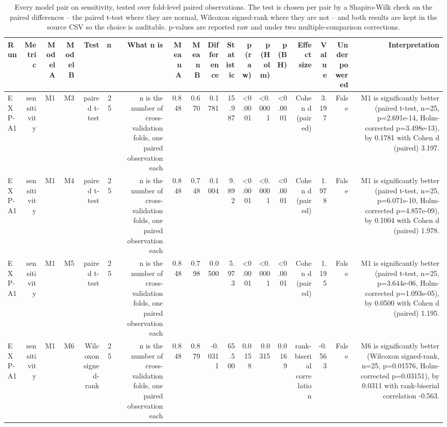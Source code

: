 \begin{table}[htbp]
  \centering
  \caption{Every model pair on sensitivity, tested over fold-level paired observations. The test is chosen per pair by a Shapiro-Wilk check on the paired differences -- the paired t-test where they are normal, Wilcoxon signed-rank where they are not -- and both results are kept in the source CSV so the choice is auditable. p-values are reported raw and under two multiple-comparison corrections.}
  \label{tab:t28}
  \begin{tabular}{lrrrrrrrrrrrrrrrrr}
    \toprule
    Run & Metric & Model A & Model B & Test & n & What n is & Mean A & Mean B & Difference & Statistic & p (raw) & p (Holm) & p (BH) & Effect size & Value & Underpowered & Interpretation \\
    \midrule
    EXP-A1 & sensitivity & M1 & M3 & paired t-test & 25 & n is the number of cross-validation folds, one paired observation each & 0.848 & 0.670 & 0.1781 & 15.987 & <0.0001 & <0.0001 & <0.0001 & Cohen d (paired) & 3.197 & False & M1 is significantly better (paired t-test, n=25, p=2.691e-14, Holm-corrected p=3.498e-13), by 0.1781 with Cohen d (paired) 3.197. \\
    EXP-A1 & sensitivity & M1 & M4 & paired t-test & 25 & n is the number of cross-validation folds, one paired observation each & 0.848 & 0.748 & 0.1004 & 9.892 & <0.0001 & <0.0001 & <0.0001 & Cohen d (paired) & 1.978 & False & M1 is significantly better (paired t-test, n=25, p=6.071e-10, Holm-corrected p=4.857e-09), by 0.1004 with Cohen d (paired) 1.978. \\
    EXP-A1 & sensitivity & M1 & M5 & paired t-test & 25 & n is the number of cross-validation folds, one paired observation each & 0.848 & 0.798 & 0.0500 & 5.973 & <0.0001 & <0.0001 & <0.0001 & Cohen d (paired) & 1.195 & False & M1 is significantly better (paired t-test, n=25, p=3.644e-06, Holm-corrected p=1.093e-05), by 0.0500 with Cohen d (paired) 1.195. \\
    EXP-A1 & sensitivity & M1 & M6 & Wilcoxon signed-rank & 25 & n is the number of cross-validation folds, one paired observation each & 0.848 & 0.879 & -0.0311 & 65.500 & 0.0158 & 0.0315 & 0.0169 & rank-biserial correlation & -0.563 & False & M6 is significantly better (Wilcoxon signed-rank, n=25, p=0.01576, Holm-corrected p=0.03151), by 0.0311 with rank-biserial correlation -0.563. \\

\end{tabular}
\end{table}
